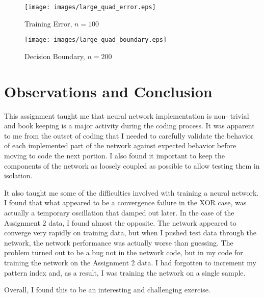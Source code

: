 \documentclass{article}
\begin{document}
\begin{figure}
  \centering
  \texttt{[image: images/large\_quad\_error.eps]}
  \caption{Training Error, $n=100$}
  \label{fig:large-quad-error}
\end{figure}

\begin{figure}
  \centering
  \texttt{[image: images/large\_quad\_boundary.eps]}
  \caption{Decision Boundary, $n=200$}
  \label{fig:large-quad-boundary}
\end{figure}



\section*{Observations and Conclusion}
This assignment taught me that neural network implementation is non-
trivial and book keeping is a major activity during the coding
process.  It was apparent to me from the outset of coding that I
needed to carefully validate the behavior of each implemented part of
the network against expected behavior before moving to code the next
portion. I also found it important to keep the components of the
network as loosely coupled as possible to allow testing them in
isolation.

It also taught me some of the difficulties involved with training a
neural network.  I found that what appeared to be a convergence
failure in the XOR case, was actually a temporary oscillation that
damped out later.  In the case of the Assignment 2 data, I found
almost the opposite.  The network appeared to converge very rapidly on
training data, but when I pushed test data through the network, the
network performance was actually worse than guessing. The problem
turned out to be a bug not in the network code, but in my code for
training the network on the Assignment 2 data.  I had forgotten to
increment my pattern index and, as a result, I was training the
network on a single sample.

Overall, I found this to be an interesting and challenging exercise.
\end{document}
